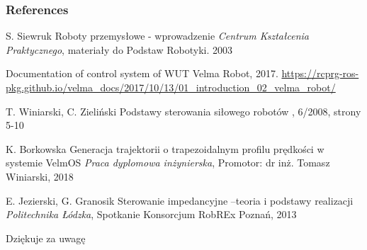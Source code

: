 
\begin{frame}
\frametitle{References}
\footnotesize{
\begin{thebibliography}{99} %
 S. Siewruk
\newblock Roboty przemysłowe - wprowadzenie
\newblock \emph{Centrum Kształcenia Praktycznego}, materiały do Podstaw Robotyki. 2003

 Documentation of control system of WUT Velma Robot, 2017.
\newblock \url{https://rcprg-ros-pkg.github.io/velma\_docs/2017/10/13/01\_introduction\_02\_velma\_robot/}

 T. Winiarski, C. Zieliński
\newblock Podstawy sterowania siłowego robotów
, 6/2008, strony 5-10

 K. Borkowska
\newblock Generacja trajektorii o trapezoidalnym profilu prędkości w systemie VelmOS
\newblock \emph{Praca dyplomowa inżynierska}, Promotor: dr inż. Tomasz Winiarski, 2018

 E. Jezierski, G. Granosik
\newblock Sterowanie impedancyjne –teoria i podstawy realizacji
\newblock \emph{Politechnika Łódzka}, Spotkanie Konsorcjum RobREx Poznań, 2013 

\end{thebibliography}
}
\end{frame}


\begin{frame}
\Huge{\centerline{Dziękuje za uwagę}}
\end{frame}